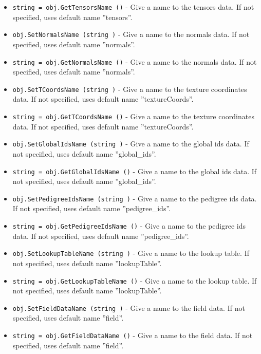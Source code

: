 \begin{itemize}
\item  \verb|string = obj.GetTensorsName ()| -  Give a name to the tensors data. If not specified, uses default
 name ''tensors''.

\item  \verb|obj.SetNormalsName (string )| -  Give a name to the normals data. If not specified, uses default
 name ''normals''.

\item  \verb|string = obj.GetNormalsName ()| -  Give a name to the normals data. If not specified, uses default
 name ''normals''.

\item  \verb|obj.SetTCoordsName (string )| -  Give a name to the texture coordinates data. If not specified, uses 
 default name ''textureCoords''.

\item  \verb|string = obj.GetTCoordsName ()| -  Give a name to the texture coordinates data. If not specified, uses 
 default name ''textureCoords''.

\item  \verb|obj.SetGlobalIdsName (string )| -  Give a name to the global ids data. If not specified, uses 
 default name ''global\_ids''.

\item  \verb|string = obj.GetGlobalIdsName ()| -  Give a name to the global ids data. If not specified, uses 
 default name ''global\_ids''.

\item  \verb|obj.SetPedigreeIdsName (string )| -  Give a name to the pedigree ids data. If not specified, uses 
 default name ''pedigree\_ids''.

\item  \verb|string = obj.GetPedigreeIdsName ()| -  Give a name to the pedigree ids data. If not specified, uses 
 default name ''pedigree\_ids''.

\item  \verb|obj.SetLookupTableName (string )| -  Give a name to the lookup table. If not specified, uses default
 name ''lookupTable''.

\item  \verb|string = obj.GetLookupTableName ()| -  Give a name to the lookup table. If not specified, uses default
 name ''lookupTable''.

\item  \verb|obj.SetFieldDataName (string )| -  Give a name to the field data. If not specified, uses default 
 name ''field''.

\item  \verb|string = obj.GetFieldDataName ()| -  Give a name to the field data. If not specified, uses default 
 name ''field''.

\end{itemize}
